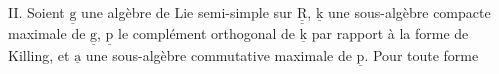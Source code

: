 II. Soient $\underline{\mathrm g}$ une algèbre de Lie semi-simple sur $\underline{\underline{\mathrm R}}$, $\underline{\mathrm k}$ une sous-algèbre compacte maximale de $\underline{\mathrm g}$, $\underline{\mathrm p}$ le complément orthogonal de $\underline{\mathrm k}$ par rapport à la forme de Killing, et $\underline{\mathrm a}$ une sous-algèbre commutative maximale de $\underline{\mathrm p}$. Pour toute forme

